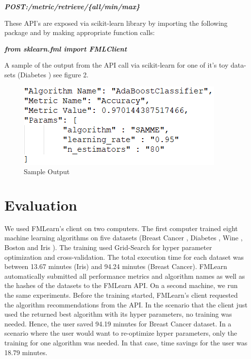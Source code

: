 \documentclass{article}
\begin{document}
\textbf{\textit{POST:/metric/retrieve/\{all/min/max\}}}

These API’s are exposed via scikit-learn library by importing the following package and by making appropriate function calls:

\textbf{\textit{from sklearn.fml import FMLClient}}

A sample of the output from the API call via scikit-learn for one of it's toy data-sets (Diabetes \cite{bradley-et-al}) see figure 2.
\begin{figure}[ht]
    \centering
    \includegraphics{sample-output.png}
    \caption{Sample Output}
    \label{sample-output}
\end{figure}


\section{Evaluation}
 We used FMLearn's client on two computers. The first computer trained eight machine learning algorithms on five datasets (Breast Cancer \cite{brendan-et-al}, Diabetes \cite{bradley-et-al}, Wine \cite{lichman:m}, Boston \cite{harrison-et-al} and Iris \cite{fisher:r}). The training used Grid-Search for hyper parameter optimization and cross-validation. The total execution time for each dataset was between 13.67 minutes (Iris) and 94.24 minutes (Breast Cancer). FMLearn automatically submitted all performance metrics and algorithm names as well as the hashes of the datasets to the FMLearn API. On a second machine, we run the same experiments. Before the training started, FMLearn's client requested the algorithm recommendations from the API. In the scenario that the client just used the returned best algorithm with its hyper parameters, no training was needed. Hence, the user saved 94.19 minutes for Breast Cancer dataset. In a scenario where the user would want to re-optimize hyper parameters, only the training for one algorithm was needed. In that case, time savings for the user was 18.79 minutes.
 
\end{document}
